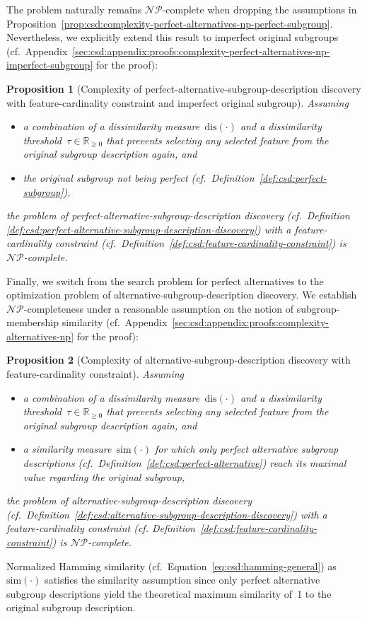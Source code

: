 \documentclass{article}
\newtheorem{proposition}{Proposition}
\theoremstyle{definition}
\begin{document}
The problem naturally remains $\mathcal{NP}$-complete when dropping the assumptions in Proposition~\ref{prop:csd:complexity-perfect-alternatives-np-perfect-subgroup}.
Nevertheless, we explicitly extend this result to imperfect original subgroups (cf.~Appendix~\ref{sec:csd:appendix:proofs:complexity-perfect-alternatives-np-imperfect-subgroup} for the proof):
%
\begin{proposition}[Complexity of perfect-alternative-subgroup-description discovery with feature-cardinality constraint and imperfect original subgroup]
	Assuming
	\begin{itemize}[noitemsep]
		\item a combination of a dissimilarity measure~$\text{dis}(\cdot)$ and a dissimilarity threshold~$\tau \in \mathbb{R}_{\geq 0}$ that prevents selecting any selected feature from the original subgroup description again, and
		\item the original subgroup \emph{not} being perfect (cf.~Definition~\ref{def:csd:perfect-subgroup}),
	\end{itemize}
	the problem of perfect-alternative-subgroup-description discovery (cf.~Definition \ref{def:csd:perfect-alternative-subgroup-description-discovery}) with a feature-cardinality constraint (cf.~Definition~\ref{def:csd:feature-cardinality-constraint}) is $\mathcal{NP}$-complete.
	\label{prop:csd:complexity-perfect-alternatives-np-imperfect-subgroup}
\end{proposition}
%
Finally, we switch from the search problem for perfect alternatives to the optimization problem of alternative-subgroup-description discovery.
We establish $\mathcal{NP}$-completeness under a reasonable assumption on the notion of subgroup-membership similarity (cf.~Appendix~\ref{sec:csd:appendix:proofs:complexity-alternatives-np} for the proof):
%
\begin{proposition}[Complexity of alternative-subgroup-description discovery with feature-cardinality constraint]
	Assuming
	\begin{itemize}[noitemsep]
		\item a combination of a dissimilarity measure~$\text{dis}(\cdot)$ and a dissimilarity threshold~$\tau \in \mathbb{R}_{\geq 0}$ that prevents selecting any selected feature from the original subgroup description again, and
		\item a similarity measure~$\text{sim}(\cdot)$ for which only perfect alternative subgroup descriptions (cf.~Definition~\ref{def:csd:perfect-alternative}) reach its maximal value regarding the original subgroup,
	\end{itemize}
	the problem of alternative-subgroup-description discovery (cf.~Definition~\ref{def:csd:alternative-subgroup-description-discovery}) with a feature-cardinality constraint (cf. Definition~\ref{def:csd:feature-cardinality-constraint}) is $\mathcal{NP}$-complete.
	\label{prop:csd:complexity-alternatives-np}
\end{proposition}
%
Normalized Hamming similarity (cf.~Equation~\ref{eq:csd:hamming-general}) as~$\text{sim}(\cdot)$ satisfies the similarity assumption since only perfect alternative subgroup descriptions yield the theoretical maximum similarity of~1 to the original subgroup description.
\end{document}
